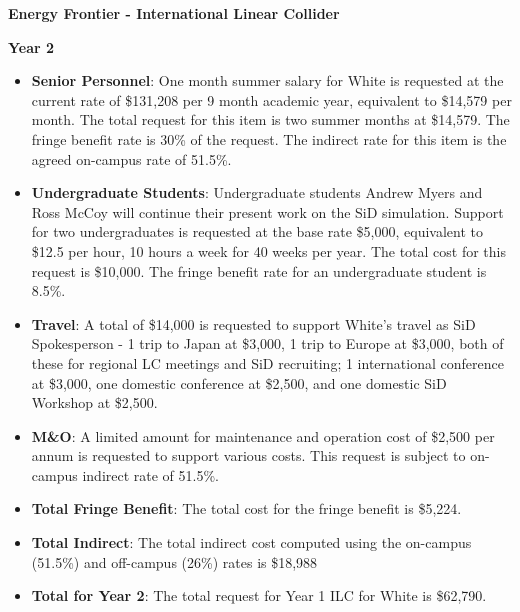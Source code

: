 \textbf{Energy Frontier - International Linear Collider}

\item{\bf Year 2}

\begin{itemize}

\item{{\bf Senior Personnel}: One month summer salary for White is requested at the current rate of \$131,208 per 9 month academic year, 
equivalent to \$14,579 per month.  The total request for this item is two summer months at \$14,579. The fringe benefit rate is 30\% of the request.  
The indirect rate for this item is the agreed on-campus rate of 51.5\%.}

\item {{\bf Undergraduate Students}: Undergraduate students Andrew Myers and Ross McCoy will continue their present work on the SiD simulation.
Support for two undergraduates is requested at the base rate \$5,000, equivalent to \$12.5 per hour, 10 hours a week for 40 weeks per year.  
The total cost for this request is \$10,000.  The fringe benefit rate for an undergraduate student is 8.5\%.}

\item{{\bf Travel}: A total of \$14,000 is requested to support White's travel as SiD Spokesperson - 1 trip to Japan at \$3,000, 1 trip to
Europe at \$3,000, both of these for regional LC meetings and SiD recruiting; 1 international conference at \$3,000, one domestic conference 
at \$2,500, and one domestic SiD Workshop at \$2,500.}

\item {{\bf M\&O}: A limited amount for maintenance and operation cost of \$2,500 per annum is requested to support various costs.   
This request is subject to on-campus indirect rate of 51.5\%.}

\item {{\bf Total Fringe Benefit}: The total cost for the fringe benefit is \$5,224.}

\item {{\bf Total Indirect}: The total indirect cost computed using the on-campus (51.5\%) and off-campus (26\%) rates is \$18,988}

\item {{\bf Total for Year 2}: The total request for Year 1 ILC for White is \$62,790.}

\end{itemize}